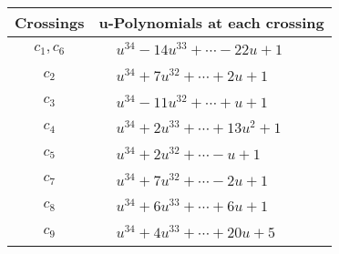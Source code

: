 \documentclass[1p]{elsarticle_modified}
\theoremstyle{definition}
\begin{document}
\begin{tabular}{m{50pt}|m{274pt}}
Crossings & \hspace{64pt}u-Polynomials at each crossing \\
\hline $$\begin{aligned}c_{1},c_{6}\end{aligned}$$&$\begin{aligned}
&u^{34}-14 u^{33}+\cdots-22 u+1
\end{aligned}$\\
\hline $$\begin{aligned}c_{2}\end{aligned}$$&$\begin{aligned}
&u^{34}+7 u^{32}+\cdots+2 u+1
\end{aligned}$\\
\hline $$\begin{aligned}c_{3}\end{aligned}$$&$\begin{aligned}
&u^{34}-11 u^{32}+\cdots+u+1
\end{aligned}$\\
\hline $$\begin{aligned}c_{4}\end{aligned}$$&$\begin{aligned}
&u^{34}+2 u^{33}+\cdots+13 u^2+1
\end{aligned}$\\
\hline $$\begin{aligned}c_{5}\end{aligned}$$&$\begin{aligned}
&u^{34}+2 u^{32}+\cdots- u+1
\end{aligned}$\\
\hline $$\begin{aligned}c_{7}\end{aligned}$$&$\begin{aligned}
&u^{34}+7 u^{32}+\cdots-2 u+1
\end{aligned}$\\
\hline $$\begin{aligned}c_{8}\end{aligned}$$&$\begin{aligned}
&u^{34}+6 u^{33}+\cdots+6 u+1
\end{aligned}$\\
\hline $$\begin{aligned}c_{9}\end{aligned}$$&$\begin{aligned}
&u^{34}+4 u^{33}+\cdots+20 u+5
\end{aligned}$\\

\end{tabular}
\end{document}
